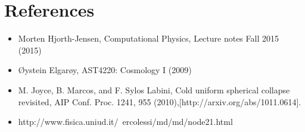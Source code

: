 \documentclass{aa}   %
\begin{document}
\section{References} \label{sec:ref}
\begin{itemize}
\item Morten Hjorth-Jensen, Computational Physics, Lecture notes Fall 2015 (2015)
\item Øystein Elgarøy, AST4220: Cosmology I (2009)
\item M. Joyce, B. Marcos, and F. Sylos Labini, Cold uniform spherical collapse revisited, AIP Conf. Proc. 1241, 955 (2010),[http://arxiv.org/abs/1011.0614].
\item http://www.fisica.uniud.it/~ercolessi/md/md/node21.html
\end{itemize}
\end{document}
